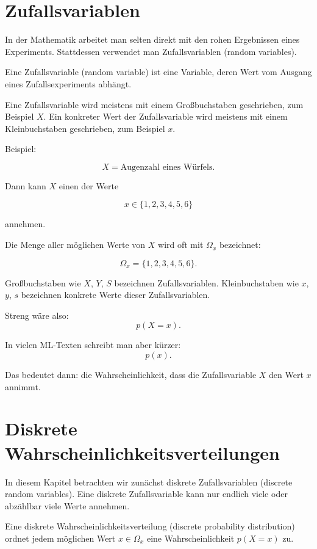 \section{Zufallsvariablen}

In der Mathematik arbeitet man selten direkt mit den rohen Ergebnissen eines Experiments.
Stattdessen verwendet man Zufallsvariablen (random variables).

\begin{definitionbox}
Eine Zufallsvariable (random variable) ist eine Variable, deren Wert vom Ausgang eines Zufallsexperiments abhängt.

Eine Zufallsvariable wird meistens mit einem Großbuchstaben geschrieben, zum Beispiel \(X\).
Ein konkreter Wert der Zufallsvariable wird meistens mit einem Kleinbuchstaben geschrieben, zum Beispiel \(x\).
\end{definitionbox}

Beispiel:

\[
    X = \text{Augenzahl eines Würfels}.
\]

Dann kann \(X\) einen der Werte

\[
    x \in \{1,2,3,4,5,6\}
\]

annehmen.

Die Menge aller möglichen Werte von \(X\) wird oft mit \(\Omega_x\) bezeichnet:

\[
    \Omega_x = \{1,2,3,4,5,6\}.
\]

\begin{notebox}
Großbuchstaben wie \(X\), \(Y\), \(S\) bezeichnen Zufallsvariablen.
Kleinbuchstaben wie \(x\), \(y\), \(s\) bezeichnen konkrete Werte dieser Zufallsvariablen.

Streng wäre also:
\[
    p(X=x).
\]

In vielen ML-Texten schreibt man aber kürzer:
\[
    p(x).
\]

Das bedeutet dann: die Wahrscheinlichkeit, dass die Zufallsvariable \(X\) den Wert \(x\) annimmt.
\end{notebox}

\section{Diskrete Wahrscheinlichkeitsverteilungen}

In diesem Kapitel betrachten wir zunächst diskrete Zufallsvariablen (discrete random variables).
Eine diskrete Zufallsvariable kann nur endlich viele oder abzählbar viele Werte annehmen.

\begin{definitionbox}
Eine diskrete Wahrscheinlichkeitsverteilung (discrete probability distribution) ordnet jedem möglichen Wert \(x \in \Omega_x\) eine Wahrscheinlichkeit \(p(X=x)\) zu.
\end{definitionbox}

